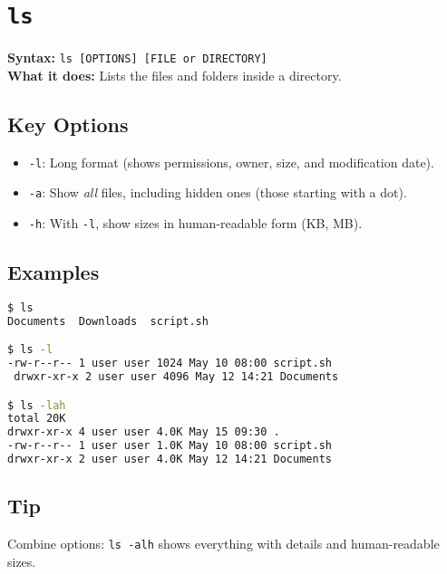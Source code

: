 \documentclass[10pt,oneside]{scrbook}
\begin{document}
\section{\texttt{ls}}
\begin{cmdbox}
  \textbf{Syntax:} \lstinline!ls [OPTIONS] [FILE or DIRECTORY]! \\
  \textbf{What it does:} Lists the files and folders inside a directory.
\end{cmdbox}
\begin{commanddetails}
  \subsection*{Key Options}
  \begin{itemize}
    \item \lstinline!-l!: Long format (shows permissions, owner, size, and modification date).
    \item \lstinline!-a!: Show \emph{all} files, including hidden ones (those starting with a dot).
    \item \lstinline!-h!: With \lstinline!-l!, show sizes in human-readable form (KB, MB).
  \end{itemize}

  \subsection*{Examples}
  \begin{lstlisting}[language=bash]
$ ls
Documents  Downloads  script.sh

$ ls -l
-rw-r--r-- 1 user user 1024 May 10 08:00 script.sh
 drwxr-xr-x 2 user user 4096 May 12 14:21 Documents

$ ls -lah
total 20K
drwxr-xr-x 4 user user 4.0K May 15 09:30 .
-rw-r--r-- 1 user user 1.0K May 10 08:00 script.sh
drwxr-xr-x 2 user user 4.0K May 12 14:21 Documents
  \end{lstlisting}
  \subsection*{Tip}
  Combine options: \lstinline!ls -alh! shows everything with details and human-readable sizes.
\end{commanddetails}

\end{document}
